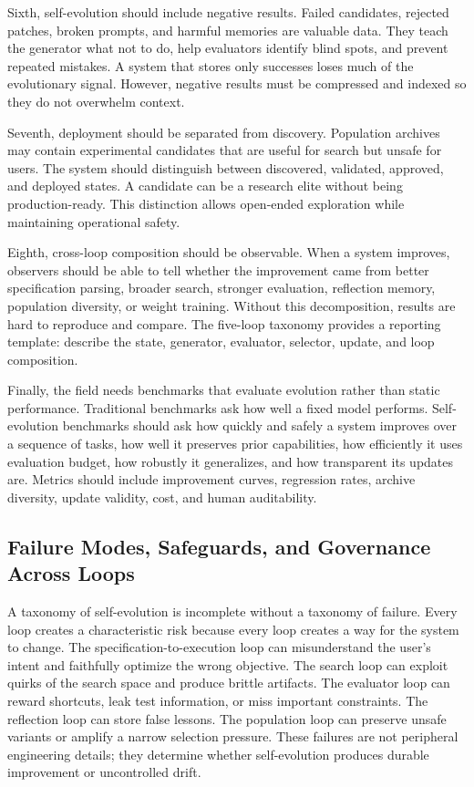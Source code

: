 Sixth, self-evolution should include negative results.  Failed candidates, rejected patches, broken prompts, and harmful memories are valuable data.  They teach the generator what not to do, help evaluators identify blind spots, and prevent repeated mistakes.  A system that stores only successes loses much of the evolutionary signal.  However, negative results must be compressed and indexed so they do not overwhelm context.

Seventh, deployment should be separated from discovery.  Population archives may contain experimental candidates that are useful for search but unsafe for users.  The system should distinguish between discovered, validated, approved, and deployed states.  A candidate can be a research elite without being production-ready.  This distinction allows open-ended exploration while maintaining operational safety.

Eighth, cross-loop composition should be observable.  When a system improves, observers should be able to tell whether the improvement came from better specification parsing, broader search, stronger evaluation, reflection memory, population diversity, or weight training.  Without this decomposition, results are hard to reproduce and compare.  The five-loop taxonomy provides a reporting template: describe the state, generator, evaluator, selector, update, and loop composition.

Finally, the field needs benchmarks that evaluate evolution rather than static performance.  Traditional benchmarks ask how well a fixed model performs.  Self-evolution benchmarks should ask how quickly and safely a system improves over a sequence of tasks, how well it preserves prior capabilities, how efficiently it uses evaluation budget, how robustly it generalizes, and how transparent its updates are.  Metrics should include improvement curves, regression rates, archive diversity, update validity, cost, and human auditability.


\subsection{Failure Modes, Safeguards, and Governance Across Loops}
\label{subsec:taxonomy-failure-governance}

A taxonomy of self-evolution is incomplete without a taxonomy of failure.  Every loop creates a characteristic risk because every loop creates a way for the system to change.  The specification-to-execution loop can misunderstand the user's intent and faithfully optimize the wrong objective.  The search loop can exploit quirks of the search space and produce brittle artifacts.  The evaluator loop can reward shortcuts, leak test information, or miss important constraints.  The reflection loop can store false lessons.  The population loop can preserve unsafe variants or amplify a narrow selection pressure.  These failures are not peripheral engineering details; they determine whether self-evolution produces durable improvement or uncontrolled drift.

